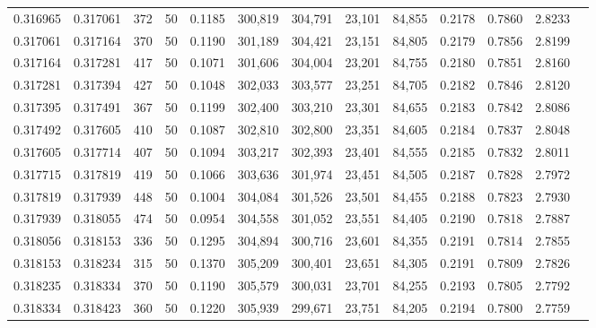 \begin{tabular}{rrrrrrrrrrrrr}
0.316965 & 0.317061 &   372 &  50 &                                     0.1185 & 300,819 & 304,791 &  23,101 &  84,855 & 0.2178 & 0.7860 & 2.8233 \\
0.317061 & 0.317164 &   370 &  50 &                                     0.1190 & 301,189 & 304,421 &  23,151 &  84,805 & 0.2179 & 0.7856 & 2.8199 \\
0.317164 & 0.317281 &   417 &  50 &                                     0.1071 & 301,606 & 304,004 &  23,201 &  84,755 & 0.2180 & 0.7851 & 2.8160 \\
0.317281 & 0.317394 &   427 &  50 &                                     0.1048 & 302,033 & 303,577 &  23,251 &  84,705 & 0.2182 & 0.7846 & 2.8120 \\
0.317395 & 0.317491 &   367 &  50 &                                     0.1199 & 302,400 & 303,210 &  23,301 &  84,655 & 0.2183 & 0.7842 & 2.8086 \\
0.317492 & 0.317605 &   410 &  50 &                                     0.1087 & 302,810 & 302,800 &  23,351 &  84,605 & 0.2184 & 0.7837 & 2.8048 \\
0.317605 & 0.317714 &   407 &  50 &                                     0.1094 & 303,217 & 302,393 &  23,401 &  84,555 & 0.2185 & 0.7832 & 2.8011 \\
0.317715 & 0.317819 &   419 &  50 &                                     0.1066 & 303,636 & 301,974 &  23,451 &  84,505 & 0.2187 & 0.7828 & 2.7972 \\
0.317819 & 0.317939 &   448 &  50 &                                     0.1004 & 304,084 & 301,526 &  23,501 &  84,455 & 0.2188 & 0.7823 & 2.7930 \\
0.317939 & 0.318055 &   474 &  50 &                                     0.0954 & 304,558 & 301,052 &  23,551 &  84,405 & 0.2190 & 0.7818 & 2.7887 \\
0.318056 & 0.318153 &   336 &  50 &                                     0.1295 & 304,894 & 300,716 &  23,601 &  84,355 & 0.2191 & 0.7814 & 2.7855 \\
0.318153 & 0.318234 &   315 &  50 &                                     0.1370 & 305,209 & 300,401 &  23,651 &  84,305 & 0.2191 & 0.7809 & 2.7826 \\
0.318235 & 0.318334 &   370 &  50 &                                     0.1190 & 305,579 & 300,031 &  23,701 &  84,255 & 0.2193 & 0.7805 & 2.7792 \\
0.318334 & 0.318423 &   360 &  50 &                                     0.1220 & 305,939 & 299,671 &  23,751 &  84,205 & 0.2194 & 0.7800 & 2.7759 \\

\end{tabular}
